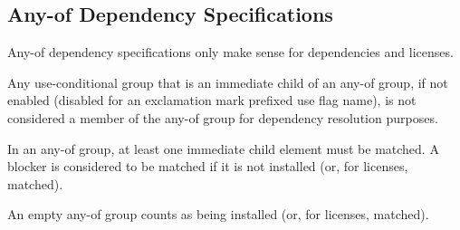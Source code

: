 \subsection{Any-of Dependency Specifications}

Any-of dependency specifications only make sense for dependencies and licenses.

Any use-conditional group that is an immediate child of an any-of group, if not enabled (disabled
for an exclamation mark prefixed use flag name), is not considered a member of the any-of group
for dependency resolution purposes.

In an any-of group, at least one immediate child element must be matched. A blocker is
considered to be matched if it is not installed (or, for licenses, matched).

An empty any-of group counts as being installed (or, for licenses, matched).


